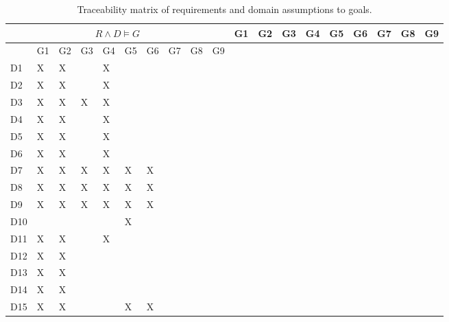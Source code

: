 \documentclass{article}
\begin{document}
\begin{longtable}[c]{|m{0.15cm}|m{0.15cm}|m{0.15cm}|m{0.15cm}|m{0.15cm}|m{0.15cm}|m{0.15cm}|m{0.15cm}|m{0.15cm}|m{0.15cm}|m{0.15cm}|}
 \caption{Traceability matrix of requirements and domain assumptions to goals.}
 \label{rg mapping}
 \hline
 \multicolumn{10}{|c|}{\cellcolor{white}$R \wedge D \vDash G$}
 \endfirsthead
 \hline
  \cellcolor{yellow!30} & \cellcolor{white}G1 & \cellcolor{white}G2 & \cellcolor{white}G3 & \cellcolor{white}G4 & \cellcolor{white}G5 & \cellcolor{white}G6 & \cellcolor{white}G7 & \cellcolor{white}G8 & \cellcolor{white}G9  \\
 \endhead
 \endfoot
 \endlastfoot
 \hline
  \cellcolor{yellow!30} & \cellcolor{white}G1 & \cellcolor{white}G2 & \cellcolor{white}G3 & \cellcolor{white}G4 & \cellcolor{white}G5 & \cellcolor{white}G6 & \cellcolor{white}G7 & \cellcolor{white}G8 & \cellcolor{white}G9  \\
 \hline
 D1 &X   &X   &   & X  &   &   &   &   &      \\
 \hline
 D2 &X   & X  &   &  X &   &   &   &   &      \\
 \hline
 D3 &X   &  X & X  &  X &   &   &   &   &      \\
 \hline
 D4 &X   &   X&   & X  &    &   &   &   &      \\
 \hline
 D5 &X   & X  &   & X  &   &   &   &   &      \\
 \hline
 D6 &X   & X  &   & X  &   &   &   &   &      \\
 \hline
 D7 &X   & X  & X  & X  & X  & X  &   &   &      \\
 \hline
 D8 &X   & X  & X  & X  & X  & X  &   &   &      \\
 \hline
 D9 &X   & X  & X  & X  & X  & X  &   &   &      \\
 \hline
 D10 &   &   &   &   & X  &   &   &   &     \\
 \hline
 D11 &X   & X  &   & X  &   &   &   &   &      \\
 \hline
 D12 &X   & X  &   &   &   &   &   &   &      \\
 \hline
 D13 &X   & X  &   &   &   &   &   &   &      \\
 \hline
 D14 &X   & X  &   &   &   &   &   &   &      \\
 \hline
 D15 &X   & X  &   &   &X   & X  &   &   &      \\

\end{longtable}
\end{document}

